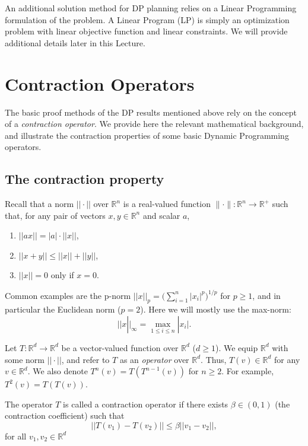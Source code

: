 An additional solution method for DP planning relies on a Linear Programming formulation of the problem. A Linear Program (LP) is simply an optimization problem with linear objective function and linear constraints. We will provide additional details later in this Lecture.

\section{Contraction Operators}

The basic proof methods of the DP results mentioned above rely on the concept of a \emph{contraction operator}. We provide here the relevant mathematical background, and illustrate the contraction properties of some basic Dynamic Programming operators.

\subsection{The contraction property}
Recall that a norm $|| \cdot ||$ over $\mathbb R^n$  is a real-valued function $\|\cdot\| : \mathbb R^n \to \mathbb R^+$ such that, for any pair of vectors $x,y \in \mathbb R^n$  and scalar $a$,
\begin{enumerate}
  \item $||ax|| = |a| \cdot ||x||$,
  \item $||x + y|| \le ||x|| + ||y||$,
  \item $||x|| = 0$ only if $x = 0$.
\end{enumerate}

Common examples are the p-norm $||x|{|_p} = (\sum\nolimits_{i = 1}^n {{{|{x_i}|}^p}{)^{1/p}}} $ for $p \ge 1$, and in particular the Euclidean norm ($p = 2$). Here we will mostly use the max-norm: \[||x|{|_\infty } = {\max _{1 \le i \le n}}|{x_i}|.\]

Let $T:\mathbb R^d \to \mathbb R^d$  be a vector-valued function over $\mathbb R^d$   ($d \ge 1$). We equip $\mathbb R^d$  with some  norm $|| \cdot ||$, and refer to $T$ as an \emph{operator} over $\mathbb R^d$.  Thus, $T(v) \in \mathbb R^d$ for any $v \in \mathbb R^d$.
We also denote ${T^n}(v) = T({T^{n - 1}}(v))$ for  $n \ge 2$. For example, ${T^2}(v) = T(T(v))$.

\begin{definition} The operator $T$ is called a contraction operator if there exists $\beta  \in (0,1)$ (the contraction coefficient) such that
                            \[||T({v_1}) - T({v_2})|| \le \beta ||{v_1} - {v_2}||,\]
                            for all $v_1,v_2 \in \mathbb R^d$
\end{definition}

